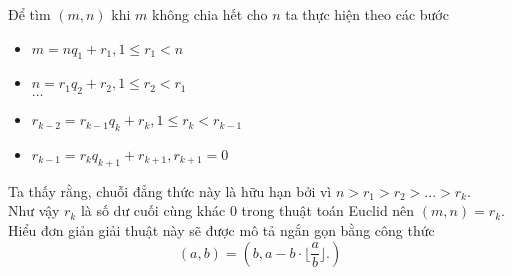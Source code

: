 Để tìm $\left( m,n \right)$ khi $m$  không chia hết cho $n$ ta thực hiện theo các bước
    \begin{itemize}
        \item $m=n{{q}_{1}}+{{r}_{1}},1\le {{r}_{1}}<n$ 
        \item $n={{r}_{1}}{{q}_{2}}+{{r}_{2}},1\le {{r}_{2}}<{{r}_{1}}$ \\
        $\ldots$
        \item ${{r}_{k-2}}={{r}_{k-1}}{{q}_{k}}+{{r}_{k}},1\le {{r}_{k}}<{{r}_{k-1}}$ 
        \item ${{r}_{k-1}}={{r}_{k}}{{q}_{k+1}}+{{r}_{k+1}},{{r}_{k+1}}=0$
    \end{itemize}
Ta thấy rằng, chuỗi đẳng thức này là hữu hạn bởi vì $n>{{r}_{1}}>{{r}_{2}}>...>{{r}_{k}}$. \\
Như vậy ${{r}_{k}}$ là số dư cuối cùng khác 0 trong thuật toán Euclid nên $\left( m,n \right)={{r}_{k}}$.
Hiểu đơn giản giải thuật này sẽ được mô tả ngắn gọn bằng công thức 
\[\left( {a,b} \right) = \left( {b,a - b\cdot \bigg\lfloor {\frac{a}{b}} \bigg\rfloor }. \right)\]

